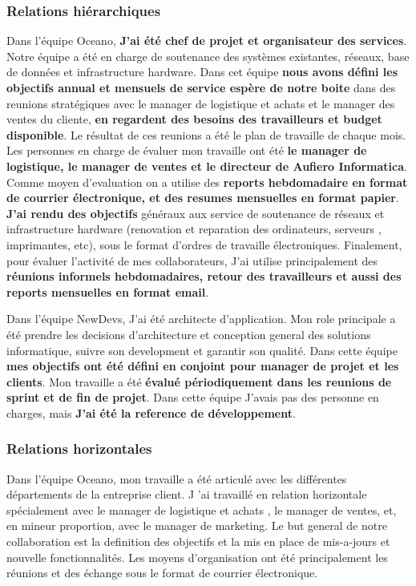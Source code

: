 \documentclass{resume} %
\begin{document}
	\subsubsection{Relations hiérarchiques} 
	
		Dans l'équipe Oceano, \textbf{J'ai été chef de projet et organisateur des services}. Notre équipe a été en charge de soutenance des systèmes existantes, réseaux, base de données et infrastructure hardware.
		Dans cet équipe \textbf{nous avons défini les objectifs annual et mensuels de service espère de notre boite} dans des reunions stratégiques avec le manager de logistique et achats et le manager des ventes du cliente, \textbf{en regardent des besoins des travailleurs et budget disponible}. Le résultat de ces reunions a été le plan de travaille de chaque mois. Les personnes en charge de évaluer mon travaille ont été \textbf{le manager de logistique, le manager de ventes et le directeur de Aufiero Informatica}. Comme moyen d'evaluation on a utilise des \textbf{reports hebdomadaire en format de courrier électronique, et des resumes mensuelles en format papier}. \textbf{J'ai rendu des objectifs} généraux aux service de soutenance de réseaux et infrastructure hardware (renovation et reparation des ordinateurs, serveurs , imprimantes, etc), sous le format d'ordres de travaille électroniques. Finalement, pour évaluer l'activité de mes collaborateurs, J'ai utilise principalement des \textbf{réunions informels hebdomadaires, retour des travailleurs et aussi des reports mensuelles en format email}.
		
		Dans l'équipe NewDevs, J'ai été architecte d'application. Mon role principale a été prendre les decisions d'architecture et conception general des solutions informatique, suivre son development et garantir son qualité. 
		Dans cette équipe \textbf{mes objectifs ont été défini en conjoint pour manager de projet et les clients}. Mon travaille a été \textbf{évalué périodiquement dans les reunions de sprint et de fin de projet}. 
		Dans cette équipe J'avais pas des  personne en charges, mais \textbf{J'ai été la reference de développement}.


	\subsubsection{Relations horizontales}
		
		Dans l'équipe Oceano, mon travaille a été articulé  avec  les différentes départements de la entreprise client. J
		'ai travaillé en relation horizontale spécialement avec le manager de logistique et achats , le manager de ventes, et, en mineur proportion, avec le manager de marketing. 
		Le but general de notre collaboration est la definition des objectifs et la mis en place de mis-a-jours et nouvelle fonctionnalités. 
		Les moyens d'organisation ont été principalement les réunions et des échange sous le format de courrier électronique. 
		
\end{document}
